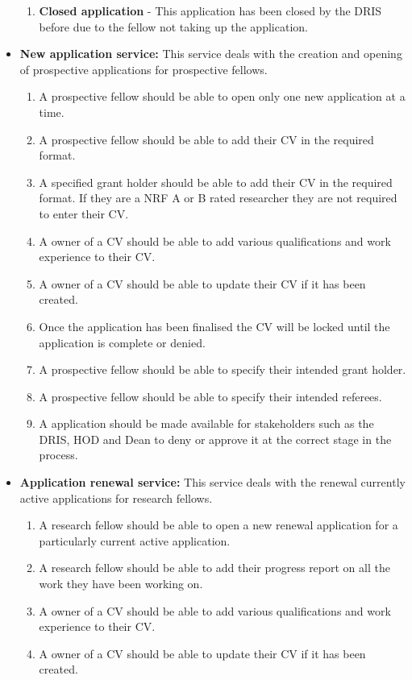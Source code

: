 \documentclass[12pt]{article}
\begin{document}
\begin{itemize}
\begin{enumerate}
			\item \textbf{Closed application} - This application has been closed by the DRIS before due to the fellow not taking up the application.	
		\end{enumerate}
		\item\textbf{ New application service:}	
		This service deals with the creation and opening of prospective applications for prospective fellows.	
		\begin{enumerate}			
			\item A prospective fellow should be able to open only one new application at a time.
			\item A prospective fellow should be able to add their CV in the required format.
			\item A specified grant holder should be able to add their CV in the required format. If they are a NRF A or B rated researcher they are not required to enter their CV.
			\item A owner of a CV should be able to add various qualifications and work experience to their CV. 
			\item A owner of a CV should be able to update their CV if it has been created. 
			\item Once the application has been finalised the CV will be locked until the application is complete or denied.
			\item A prospective fellow should be able to specify their intended grant holder.	
			\item A prospective fellow should be able to specify their intended referees.				
			\item A application should be made available for stakeholders such as the DRIS, HOD and Dean to deny or approve it at the correct stage in the process. 		
		\end{enumerate}			
		\item\textbf{ Application renewal service:}
		This service deals with the renewal currently active applications for research fellows.
		\begin{enumerate}					
			\item A research fellow should be able to open a new renewal application for a particularly current active application. 
			\item A research fellow should be able to add their progress report on all the work they have been working on.	
			\item A owner of a CV should be able to add various qualifications and work experience to their CV. 
			\item A owner of a CV should be able to update their CV if it has been created. 

\end{enumerate}
\end{itemize}
\end{document}
